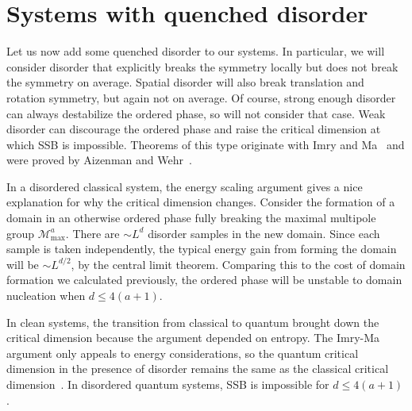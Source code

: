 \documentclass[pra,aps,twocolumn, amsfonts,amsmath,amssymb,nofootinbib,superscriptaddress]{revtex4-2}
\newcommand{\todo}[1]{\textcolor{orange}{#1}}
\newcommand{\charlie}[1]{\textcolor{Blue}{#1}}
\renewcommand{\max}{\text{max}}
\newcommand{\ethan}[1]{ { \color{blue} \footnotesize \textsf{ethan: \textsl{#1}} }}
\providecommand{\DIFdelend}{} %
\DeclareRobustCommand{\DIFdelend}{\DIFOaddend \let\includegraphics\DIFOincludegraphics} %
\begin{document}


\DIFdelend \section{Systems with quenched disorder} \label{sec:disord}

Let us now add some quenched disorder to our systems. In particular, we will consider disorder that explicitly breaks the symmetry locally but does not break the symmetry on average. Spatial disorder will also break translation and rotation symmetry, but again not on average. Of course, strong enough disorder can always destabilize the ordered phase, so will not consider that case. Weak disorder can discourage the ordered phase and raise the critical dimension at which SSB is impossible. Theorems of this type originate with Imry and Ma~\cite{ImryMa} and were proved by Aizenman and Wehr~\cite{Aizenman}.

In a disordered classical system, the energy scaling argument gives a nice explanation for why the critical dimension changes. Consider the formation of a domain in an otherwise ordered phase fully breaking the maximal multipole group $\mathcal{M}^a_\max$. There are $\sim L^d$ disorder samples in the new domain. Since each sample is taken independently, the typical energy gain from forming the domain will be $\sim L^{d/2}$, by the central limit theorem. Comparing this to the cost of domain formation we calculated previously, the ordered phase will be unstable to domain nucleation when $d\le 4(a+1)$. 

In clean systems, the transition from classical to quantum brought down the critical dimension because the argument depended on entropy. The Imry-Ma argument only appeals to energy considerations, so the quantum critical dimension in the presence of disorder remains the same as the classical critical dimension~\cite{Vojta2013}. In disordered quantum systems, SSB is impossible for $d\le 4(a+1)$.
\end{document}
